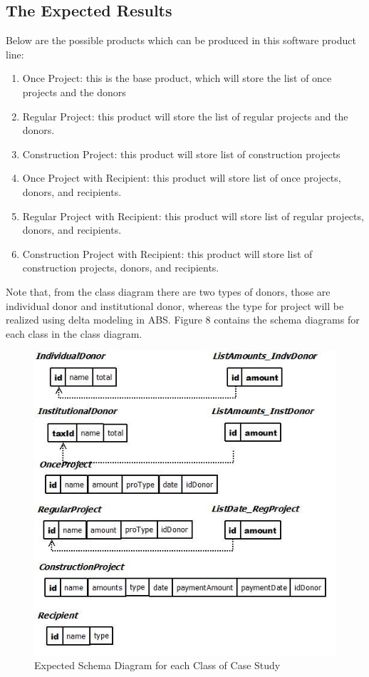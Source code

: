 \documentclass[runningheads,a4paper]{llncs}
\begin{document}
\subsection{The Expected Results}
Below are the possible products which can be produced in this software product line:
\begin{enumerate}
	\item Once Project: this is the base product, which will store the list of once projects and the donors
	\item Regular Project: this product will store the list of regular projects and the donors.
	\item Construction Project: this product will store list of construction projects
	\item Once Project with Recipient: this product will store list of once projects, donors, and recipients.
	\item Regular Project with Recipient: this product will store list of regular projects, donors, and recipients.
	\item Construction Project with Recipient: this product will store list of construction projects, donors, and recipients.
\end{enumerate}

Note that, from the class diagram there are two types of donors, those are individual donor and institutional donor, whereas the type for project will be  
realized using delta modeling in ABS. Figure 8 contains the schema diagrams for each class in the class diagram.

\begin{figure}
	\centering
	\includegraphics[scale=0.7]{db3.jpg}
	\caption{Expected Schema Diagram for each Class of Case Study}
	\label{Figure 8}
\end{figure}
\end{document}

